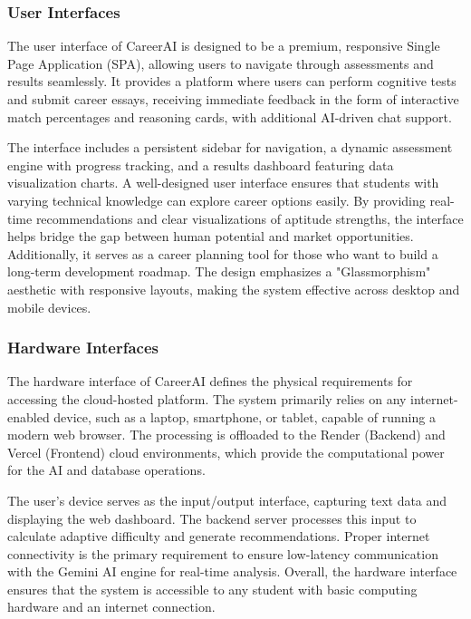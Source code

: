 \subsubsection{{User Interfaces}}
{}{The user interface of CareerAI is designed to be a premium, responsive Single Page Application (SPA), allowing users to navigate through assessments and results seamlessly. It provides a platform where users can perform cognitive tests and submit career essays, receiving immediate feedback in the form of interactive match percentages and reasoning cards, with additional AI-driven chat support.

The interface includes a persistent sidebar for navigation, a dynamic assessment engine with progress tracking, and a results dashboard featuring data visualization charts. A well-designed user interface ensures that students with varying technical knowledge can explore career options easily.\newline
By providing real-time recommendations and clear visualizations of aptitude strengths, the interface helps bridge the gap between human potential and market opportunities. Additionally, it serves as a career planning tool for those who want to build a long-term development roadmap. The design emphasizes a "Glassmorphism" aesthetic with responsive layouts, making the system effective across desktop and mobile devices.}

\subsubsection{{Hardware Interfaces}}
{}{The hardware interface of CareerAI defines the physical requirements for accessing the cloud-hosted platform. The system primarily relies on any internet-enabled device, such as a laptop, smartphone, or tablet, capable of running a modern web browser. The processing is offloaded to the Render (Backend) and Vercel (Frontend) cloud environments, which provide the computational power for the AI and database operations.

The user's device serves as the input/output interface, capturing text data and displaying the web dashboard. The backend server processes this input to calculate adaptive difficulty and generate recommendations. Proper internet connectivity is the primary requirement to ensure low-latency communication with the Gemini AI engine for real-time analysis. Overall, the hardware interface ensures that the system is accessible to any student with basic computing hardware and an internet connection.}

